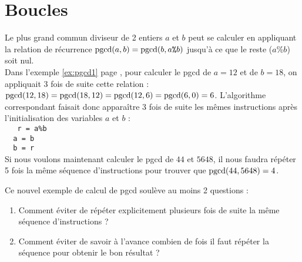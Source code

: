 \section{Boucles}\label{boucles}
\begin{ex}\label{ex:pgcd2}
Le plus grand commun diviseur de 2 entiers $a$ et $b$ peut se calculer en appliquant
la relation de récurrence ${\rm pgcd}(a,b) = {\rm pgcd}(b,a\mbox{\tt\%}b)$ jusqu'à ce que le reste
($a\%b$) soit nul.\\
Dans l'exemple \ref{ex:pgcd1} page \pageref{ex:pgcd1}, 
pour calculer le pgcd de $a=12$ et de $b=18$, on appliquait 3 fois de suite
cette relation :
${\rm pgcd}(12,18) = {\rm pgcd}(18,12) = {\rm pgcd}(12,6) = {\rm pgcd}(6,0) = 6$. 
L'algorithme correspondant faisait donc apparaître 3 fois de suite les mêmes instructions 
après l'initialisation des variables $a$ et $b$ :\\
{\tt
\mbox{}\ \ r = a\%b\\
\mbox{}\ \ a = b\\
\mbox{}\ \ b = r}\\
Si nous voulons maintenant calculer le pgcd de $44$ et $5648$, 
il nous faudra répéter 5 fois la même séquence d'instructions pour trouver
que ${\rm pgcd}(44,5648) = 4$. 
\end{ex}
\noindent Ce nouvel exemple de calcul de pgcd soulève au moins 2 questions :
\begin{enumerate}
\item Comment éviter de répéter explicitement plusieurs fois de suite la même 
	séquence d'instructions ? 
\item Comment éviter de savoir à l'avance combien de fois il faut répéter
	la séquence pour obtenir le bon résultat ? 
\end{enumerate}
